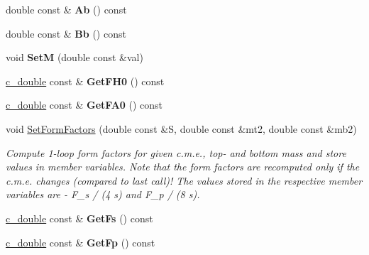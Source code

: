 \begin{DoxyCompactItemize}
\item 
\hypertarget{classHiggsBoson_a15a4d40ec981360f0c1033d5c7156c99}{}double const \& {\bfseries Ab} () const \label{classHiggsBoson_a15a4d40ec981360f0c1033d5c7156c99}

\item 
\hypertarget{classHiggsBoson_ad4dc9de0ef7ca8a9c2edb8884e41bd88}{}double const \& {\bfseries Bb} () const \label{classHiggsBoson_ad4dc9de0ef7ca8a9c2edb8884e41bd88}

\item 
\hypertarget{classHiggsBoson_a9b4cda666fb19288713b334bb72e3b40}{}void {\bfseries Set\+M} (double const \&val)\label{classHiggsBoson_a9b4cda666fb19288713b334bb72e3b40}

\item 
\hypertarget{classHiggsBoson_a89f471e351c72fcf5e95846b34727383}{}\hyperlink{Global_8h_af390c6bd8192faf6a1e2d875a1d10ca0}{c\+\_\+double} const \& {\bfseries Get\+F\+H0} () const \label{classHiggsBoson_a89f471e351c72fcf5e95846b34727383}

\item 
\hypertarget{classHiggsBoson_a2be84efb1f350882309f74db3dcc32a5}{}\hyperlink{Global_8h_af390c6bd8192faf6a1e2d875a1d10ca0}{c\+\_\+double} const \& {\bfseries Get\+F\+A0} () const \label{classHiggsBoson_a2be84efb1f350882309f74db3dcc32a5}

\item 
void \hyperlink{classHiggsBoson_a4edd830907f5f06ac24deed99e64da0c}{Set\+Form\+Factors} (double const \&S, double const \&mt2, double const \&mb2)
\begin{DoxyCompactList}\small\item\em Compute 1-\/loop form factors for given c.\+m.\+e., top-\/ and bottom mass and store values in member variables. Note that the form factors are recomputed only if the c.\+m.\+e. changes (compared to last call)! The values stored in the respective member variables are -\/ F\+\_\+s / (4 s) and F\+\_\+p / (8 s). \end{DoxyCompactList}\item 
\hypertarget{classHiggsBoson_a6e3be51e54f71ad1681485d463ba54f9}{}\hyperlink{Global_8h_af390c6bd8192faf6a1e2d875a1d10ca0}{c\+\_\+double} const \& {\bfseries Get\+Fs} () const \label{classHiggsBoson_a6e3be51e54f71ad1681485d463ba54f9}

\item 
\hypertarget{classHiggsBoson_a404990102de3ee3cd1f65a53f0759d76}{}\hyperlink{Global_8h_af390c6bd8192faf6a1e2d875a1d10ca0}{c\+\_\+double} const \& {\bfseries Get\+Fp} () const \label{classHiggsBoson_a404990102de3ee3cd1f65a53f0759d76}


\end{DoxyCompactItemize}
